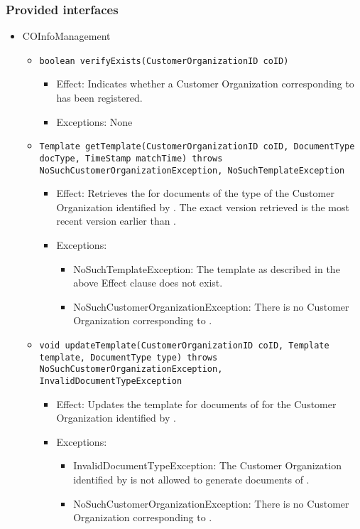 \subsubsection*{Provided interfaces}
\begin{itemize}
    \item COInfoManagement
    \begin{itemize}
		\item \texttt{boolean verifyExists(CustomerOrganizationID coID)}
		    \begin{itemize}
                \item Effect: Indicates whether a Customer Organization corresponding to  has been registered.
                \item Exceptions: None
            \end{itemize}
		
        \item \texttt{Template getTemplate(CustomerOrganizationID coID, DocumentType docType, TimeStamp matchTime) throws NoSuchCustomerOrganizationException, NoSuchTemplateException}
        \begin{itemize}
            \item Effect: Retrieves the  for documents of the type  of the Customer Organization identified by . The exact version retrieved is the most recent version earlier than .
            \item Exceptions:
            \begin{itemize}
                \item NoSuchTemplateException: The template as described in the above Effect clause does not exist.
				\item NoSuchCustomerOrganizationException: There is no Customer Organization corresponding to .
            \end{itemize}
        \end{itemize}

		\item \texttt{void updateTemplate(CustomerOrganizationID coID, Template template, DocumentType type) throws NoSuchCustomerOrganizationException, InvalidDocumentTypeException}
		    \begin{itemize}
                \item Effect: Updates the template for documents of  for the Customer Organization identified by .
                \item Exceptions:
				\begin{itemize}
					\item InvalidDocumentTypeException: The Customer Organization identified by  is not allowed to generate documents of .
					\item NoSuchCustomerOrganizationException: There is no Customer Organization corresponding to .
				\end{itemize}
            \end{itemize}


\end{itemize}
\end{itemize}
